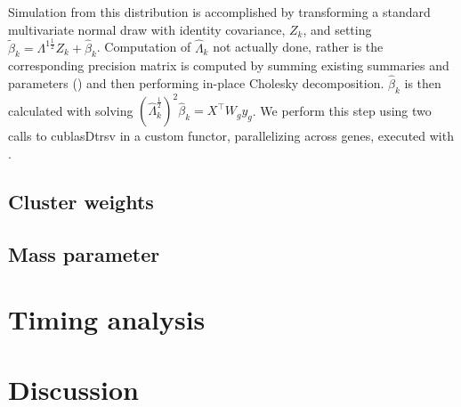 Simulation from this distribution is accomplished by transforming a standard multivariate normal draw with identity covariance, $Z_k$, and setting $\tilde{\beta}_k = \Lambda^{1\frac{1}{2}} Z_k + \hat{\beta}_k$. Computation of $\hat{\Lambda}_k$ not actually done, rather is the corresponding precision matrix is computed by summing existing summaries  and parameters () and then performing in-place Cholesky decomposition. $\hat{\beta}_k$ is then calculated with solving  $(\hat{\Lambda}_k^{\frac{1}{2}})^2\hat{\beta}_k=X^\top W_g y_g$. We perform this step using two calls to cublasDtrsv in a custom functor, parallelizing across genes, executed with .

\subsection{Cluster weights}

\subsection{Mass parameter}

\section{Timing analysis}


\section{Discussion}


